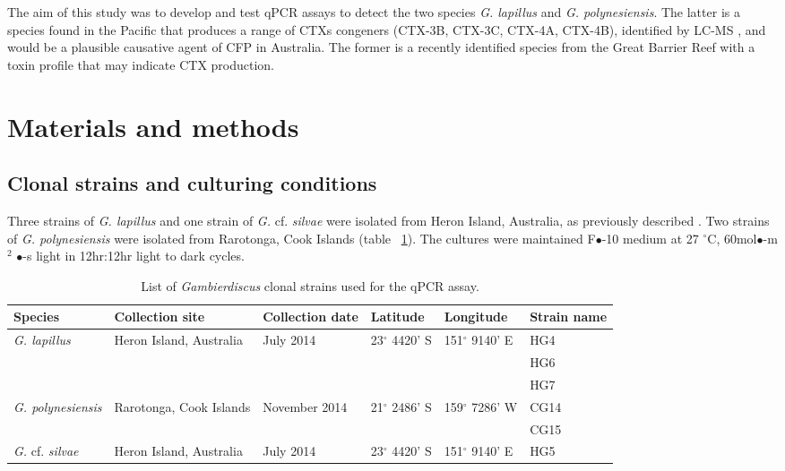 \documentclass[12pt]{article}
\begin{document}
The aim of this study was to develop and test qPCR assays to detect the two species \emph{G. lapillus} and \emph{G. polynesiensis}. The latter is a species found in the Pacific that produces a range of CTXs congeners (CTX-3B, CTX-3C, CTX-4A, CTX-4B), identified by LC-MS \cite{rhodes2014production}, and would be a plausible causative agent of CFP in Australia. The former is a recently identified species from the Great Barrier Reef with a toxin profile that may indicate CTX production.
\newpage
\section*{Materials and methods}
\subsection*{Clonal strains and culturing conditions}
Three strains of \emph{G. lapillus} 
and one strain of \emph{G.} cf. \emph{silvae} 
were isolated from Heron Island, Australia, as previously described \cite{kretzschmar2016characterization}. Two strains of \emph{G. polynesiensis} were isolated from Rarotonga, Cook Islands (table ~\ref{tbl:StrainTable}). The cultures were maintained F$\bullet$-10 medium at 27 $^{\circ}$C, 60mol$\bullet$-m$^{2}$ $\bullet$-s light in 12hr:12hr light to dark cycles.
\FloatBarrier
\begin{table}
\caption{List of \emph{Gambierdiscus} clonal strains used for the qPCR assay.}
\label{tbl:StrainTable}
\begin{tabular}{ | p{2cm} | p{2cm} | p{2cm}| p{3cm} | p{3cm} | p{2cm} | }
\hline
\textbf{Species} & \textbf{Collection site} & \textbf{Collection date} &\textbf{Latitude} & \textbf{Longitude} & \textbf{Strain name} \\
\hline
\emph{G. lapillus} &Heron Island, Australia &July 2014 &23$^{\circ}$ 4420' S&151$^{\circ}$ 9140' E & HG4 \\
\hline
&&&&& HG6\\
\hline
&&&& &HG7\\
\hline
\emph{G. polynesiensis}&Rarotonga, Cook Islands&November 2014 &21$^{\circ}$ 2486' S&159$^{\circ}$ 7286' W & CG14 \\
\hline
&&&&&CG15\\
\hline
\emph{G.} cf. \emph{silvae}&Heron Island, Australia &July 2014 &23$^{\circ}$ 4420' S&151$^{\circ}$ 9140' E& HG5\\
\hline
\end{tabular}
\end{table}
\end{document}
